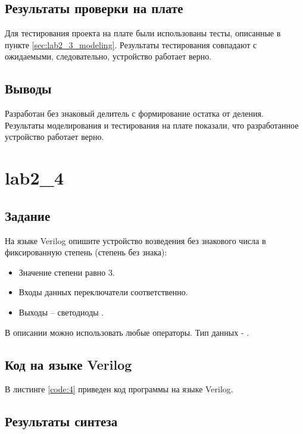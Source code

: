 \subsection{Результаты проверки на плате}

Для тестирования проекта на плате были использованы тесты, описанные в пункте \ref{sec:lab2_3_modeling}. Результаты тестирования совпадают с ожидаемыми, следовательно, устройство работает верно.

\subsection{Выводы}

Разработан без знаковый делитель с формирование остатка от деления.  Результаты моделирования и тестирования на плате показали, что разработанное устройство работает верно.


\section{lab2\_4}

\subsection{Задание}

На языке Verilog опишите устройство возведения без знакового числа в фиксированную степень (степень без знака):
\begin{itemize}
	\item Значение степени равно 3.
	\item Входы данных переключатели  соответственно.
	\item Выходы – светодиоды .
\end{itemize}

В описании можно использовать любые операторы. Тип данных - .

\subsection{Код на языке Verilog}

В листинге \ref{code:4} приведен код программы на языке Verilog.



\subsection{Результаты синтеза}

